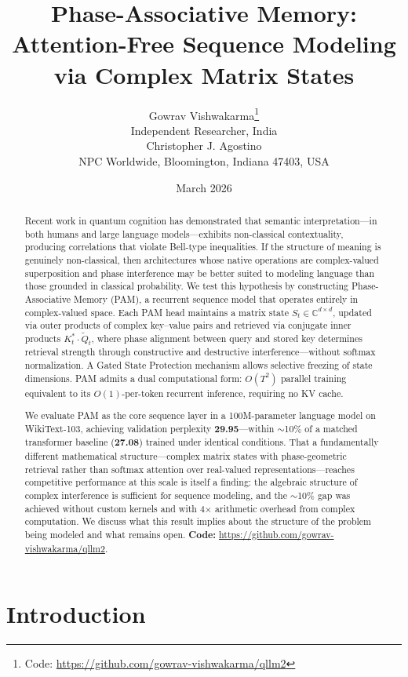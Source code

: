 \documentclass[11pt]{article}
\title{Phase-Associative Memory: Attention-Free Sequence Modeling via Complex Matrix States}
\author{%
  Gowrav Vishwakarma\thanks{Code: \url{https://github.com/gowrav-vishwakarma/qllm2}} \\
  Independent Researcher, India \\[6pt]
  Christopher J. Agostino \\
  NPC Worldwide, Bloomington, Indiana 47403, USA
}
\date{March 2026}
\newcommand{\Complex}{\mathbb{C}}
\begin{document}
\maketitle

\begin{abstract}
Recent work in quantum cognition has demonstrated that semantic interpretation---in both humans and large language models---exhibits non-classical contextuality, producing correlations that violate Bell-type inequalities. If the structure of meaning is genuinely non-classical, then architectures whose native operations are complex-valued superposition and phase interference may be better suited to modeling language than those grounded in classical probability. We test this hypothesis by constructing Phase-Associative Memory (PAM), a recurrent sequence model that operates entirely in complex-valued space. Each PAM head maintains a matrix state $S_t \in \Complex^{d \times d}$, updated via outer products of complex key--value pairs and retrieved via conjugate inner products $K_t^* \cdot \tilde{Q}_t$, where phase alignment between query and stored key determines retrieval strength through constructive and destructive interference---without softmax normalization. A Gated State Protection mechanism allows selective freezing of state dimensions. PAM admits a dual computational form: $O(T^2)$ parallel training equivalent to its $O(1)$-per-token recurrent inference, requiring no KV cache.

We evaluate PAM as the core sequence layer in a 100M-parameter language model on WikiText-103, achieving validation perplexity \textbf{29.95}---within $\sim$10\% of a matched transformer baseline (\textbf{27.08}) trained under identical conditions. That a fundamentally different mathematical structure---complex matrix states with phase-geometric retrieval rather than softmax attention over real-valued representations---reaches competitive performance at this scale is itself a finding: the algebraic structure of complex interference is sufficient for sequence modeling, and the $\sim$10\% gap was achieved without custom kernels and with 4$\times$ arithmetic overhead from complex computation. We discuss what this result implies about the structure of the problem being modeled and what remains open. \textbf{Code:} \url{https://github.com/gowrav-vishwakarma/qllm2}.
\end{abstract}

\section{Introduction}
\label{sec:intro}
\end{document}
